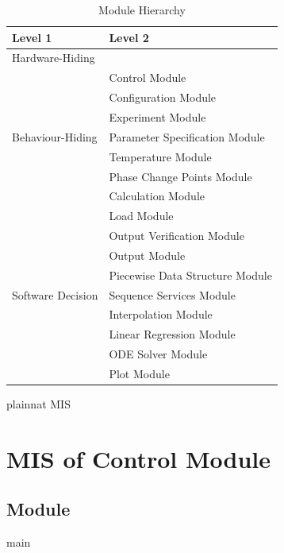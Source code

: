 \documentclass[12pt, titlepage]{article}
\begin{document}
\begin{table}[h!]
\centering
\begin{tabular}{p{} p{}}
\toprule
\textbf{Level 1} & \textbf{Level 2}\\
\midrule

{Hardware-Hiding} & ~ \\
\midrule

\multirow{7}{0.3\textwidth}{Behaviour-Hiding} 
& Control Module\\
& Configuration Module\\
& Experiment Module\\
& Parameter Specification Module\\
& Temperature Module\\
& Phase Change Points Module\\
& Calculation Module\\
& Load Module\\
& Output Verification Module\\
& Output Module\\

\midrule

\multirow{3}{0.3\textwidth}{Software Decision}
& Piecewise Data Structure Module\\
& Sequence Services Module\\
& Interpolation Module\\
& Linear Regression Module\\
& ODE Solver Module\\
& Plot Module\\

\bottomrule

\end{tabular}
\caption{Module Hierarchy}
\label{TblMH}
\end{table}

\newpage

 {plainnat}
 {MIS}

\newpage

\section{MIS of Control Module} \label{Main}

\subsection{Module}

main 
\end{document}
